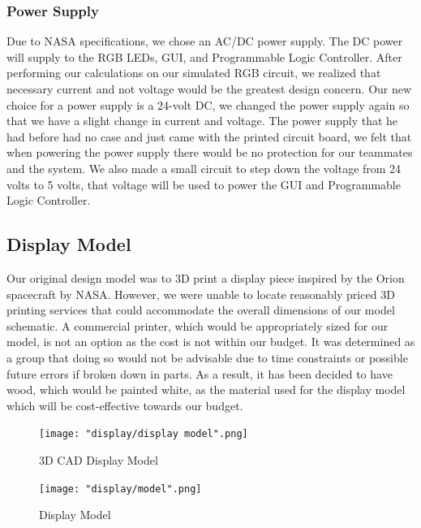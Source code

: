\documentclass[12pt,a4paper]{report}
\begin{document}
\subsubsection{Power Supply}
Due to NASA specifications, we chose an AC/DC power supply. The DC power will supply to the RGB LEDs, GUI, and Programmable Logic Controller. After performing our calculations on our simulated RGB circuit, we realized that necessary current and not voltage would be the greatest design concern. Our new choice for a power supply is a 24-volt DC, we changed the power supply again so that we have a slight change in current and voltage. The power supply that he had before had no case and just came with the printed circuit board, we felt that when powering the power supply there would be no protection for our teammates and the system. We also made a small circuit to step down the voltage from 24 volts to 5 volts, that voltage will be used to power the GUI and Programmable Logic Controller. 

\subsection{Display Model}
Our original design model was to 3D print a display piece inspired by the Orion spacecraft by NASA. However, we were unable to locate reasonably priced 3D printing services that could accommodate the overall dimensions of our model schematic. A commercial printer, which would be appropriately sized for our model, is not an option as the cost is not within our budget. It was determined as a group that doing so would not be advisable due to time constraints or possible future errors if broken down in parts. As a result, it has been decided to have wood, which would be painted white, as the material used for the display model which will be cost-effective towards our budget.
\begin{figure}[H]
	\centering
	\texttt{[image: "display/display model".png]}\par			
	\vspace{0.1cm}
	\caption{3D CAD Display Model}
\end{figure}
\begin{figure}[H]
	\centering
	\texttt{[image: "display/model".png]}\par			
	\vspace{0.1cm}
	\caption{Display Model}
\end{figure}
\end{document}
